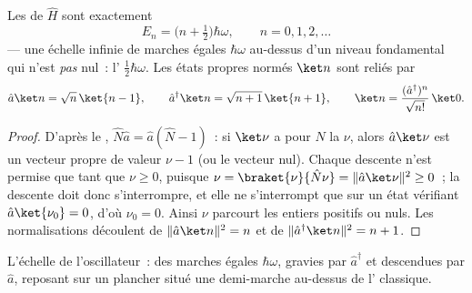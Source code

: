 \begin{theorem}\label{thm:b3:harmonic-oscillator:spectrum}
Les  de $\hat H$ sont exactement
\[
E_n = \Big(n + \tfrac12\Big)\hbar\omega , \qquad n = 0, 1, 2, \dots
\]
--- une échelle infinie de marches égales $\hbar\omega$ au-dessus d'un
niveau fondamental qui n'est \emph{pas} nul~: l'\emph{} $\tfrac12\hbar\omega$. Les états propres normés $\ket n$ sont
reliés par
\[
\hat a\ket n = \sqrt n\,\ket{n - 1} , \qquad
\hat a^\dagger\ket n = \sqrt{n + 1}\,\ket{n + 1} ,
\qquad
\ket n = \frac{(\hat a^\dagger)^n}{\sqrt{n!}}\,\ket0 .
\]
\end{theorem}

\begin{proof}
D'après le , $\hat N\hat a = \hat a(\hat N - 1)$~: si
$\ket\nu$ a pour $\hat N$ la  $\nu$, alors $\hat a\ket\nu$
est un vecteur propre de valeur $\nu - 1$ (ou le vecteur nul). Chaque
descente n'est permise que tant que $\nu \ge 0$, puisque $\nu = \braket{\nu}{\hat
N\nu} = \|\hat a\ket\nu\|^2 \ge 0$~; la descente doit donc
s'interrompre, et elle ne s'interrompt que sur un état vérifiant $\hat a\ket{\nu_0}
= 0$, d'où $\nu_0 = 0$. Ainsi $\nu$ parcourt les entiers positifs ou
nuls. Les normalisations découlent de $\|\hat a\ket n\|^2 = n$ et de
$\|\hat a^\dagger\ket n\|^2 = n + 1$.
\end{proof}

\begin{omfigure}

{\small L'échelle de l'oscillateur~: des marches égales $\hbar\omega$,
gravies par $\hat a^\dagger$ et descendues par $\hat a$, reposant sur
un plancher situé une demi-marche au-dessus de l'
classique.}
\end{omfigure}


